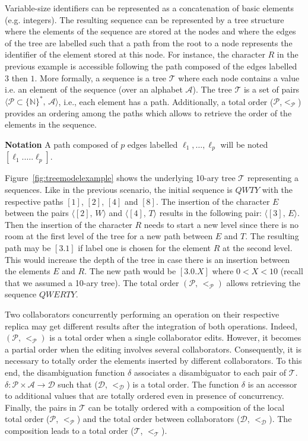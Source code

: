 Variable-size identifiers can be represented as a concatenation of basic
elements (e.g. integers). The resulting sequence can be represented by a tree
structure where the elements of the sequence are stored at the nodes and where
the edges of the tree are labelled such that a path from the root to a node
represents the identifier of the element stored at this node. For instance, the
character $R$ in the previous example is accessible following the path composed
of the edges labelled $3$ then $1$. More formally, a sequence is a tree
$\mathcal{T}$ where each node contains a value i.e. an element of the sequence
(over an alphabet $\mathcal{A}$). The tree $\mathcal{T}$ is a set of pairs
$\langle\mathcal{P}\subset\{\mathbb{N}\}^*,\, \mathcal{A} \rangle$, i.e., each
element has a path. Additionally, a total order
($\mathcal{P}$,$<_{\mathcal{P}}$) provides an ordering among the paths which
allows to retrieve the order of the elements in the sequence.

\noindent \textbf{Notation} A path composed of $p$ edges labelled
$\ell_1,\ldots,\ell_p$ will be noted $[\ell_1.\ldots.\ell_p]$.

Figure~\ref{fig:treemodelexample} shows the underlying 10-ary tree
$\mathcal{T}$ representing a sequences. Like in the previous scenario, the
initial sequence is $QWTY$ with the respective paths $[1]$, $[2]$, $[4]$ and
$[8]$. The insertion of the character $E$ between the pairs
$\langle [2],\, W\rangle$ and $\langle [4],\, T\rangle$ results in the
following pair: $\langle [3],\, E \rangle$. Then the insertion of the character
$R$ needs to start a new level since there is no room at the first level of the
tree for a new path between $E$ and $T$. The resulting path may be $[3.1]$ if
label one is chosen for the element $R$ at the second level. This would
increase the depth of the tree in case there is an insertion between the
elements $E$ and $R$. The new path would be $[3.0.X]$ where $0<X<10$ (recall
that we assumed a 10-ary tree). The total order $(\mathcal{P},\,<_\mathcal{P})$
allows retrieving the sequence $QWERTY$.

Two collaborators concurrently performing an operation on their respective
replica may get different results after the integration of both
operations. Indeed, $(\mathcal{P},\,<_\mathcal{P})$ is a total order when a
single collaborator edits. However, it becomes a partial order when the editing
involves several collaborators. Consequently, it is necessary to totally order
the elements inserted by different collaborators. To this end, the
disambiguation function $\delta$ associates a disambiguator to each pair of
$\mathcal{T}$. $\delta: \mathcal{P}\times\mathcal{A} \rightarrow \mathcal{D}$
such that ($\mathcal{D}$, $<_{\mathcal{D}}$) is a total order. The function
$\delta$ is an accessor to additional values that are totally ordered even in
presence of concurrency. Finally, the pairs in $\mathcal{T}$ can be totally
ordered with a composition of the local total order ($\mathcal{P}$,
$<_{\mathcal{P}}$) and the total order between collaborators ($\mathcal{D}$,
$<_{\mathcal{D}}$). The composition leads to a total order ($\mathcal{T}$,
$<_{\mathcal{T}}$).

